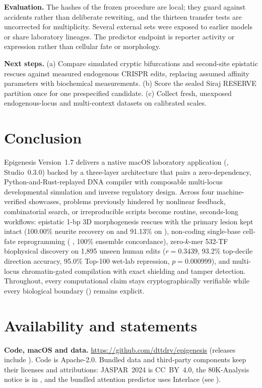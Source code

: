 \documentclass[10.5pt,a4paper]{article}
\begin{document}
\textbf{Evaluation.} The hashes of the frozen procedure are local; they guard against accidents rather than deliberate rewriting, and the thirteen transfer tests are uncorrected for multiplicity. Several external sets were exposed to earlier models or share laboratory lineages. The predictor endpoint is reporter activity or expression rather than cellular fate or morphology.

\textbf{Next steps.} (a) Compare simulated cryptic bifurcations and second-site epistatic rescues against measured endogenous CRISPR edits, replacing assumed affinity parameters with biochemical measurements. (b) Score the sealed Siraj RESERVE partition once for one prespecified candidate. (c) Collect fresh, unexposed endogenous-locus and multi-context datasets on calibrated scales.

\section{Conclusion}

Epigenesis Version~1.7 delivers a native macOS laboratory application (, Studio~0.3.0) backed by a three-layer architecture that pairs a zero-dependency, Python-and-Rust-replayed DNA compiler with composable multi-locus developmental simulation and inverse regulatory design. Across four machine-verified showcases, problems previously hindered by nonlinear feedback, combinatorial search, or irreproducible scripts become routine, seconds-long workflows: epistatic 1-bp 3D morphogenesis rescues with the primary lesion kept intact (100.00\% neurite recovery on  and 91.13\% on ), non-coding single-base cell-fate reprogramming ( , 100\% ensemble concordance), zero-$k$-mer 532-TF biophysical discovery on 1,895 unseen human edits ($r=0.3439$, 93.2\% top-decile direction accuracy, 95.0\% Top-100 wet-lab repression, $p=0.000999$), and multi-locus chromatin-gated compilation with exact shielding and tamper detection. Throughout, every computational claim stays cryptographically verifiable while every biological boundary () remains explicit.

\section{Availability and statements}

\textbf{Code, macOS  and data.} \url{https://github.com/dttdrv/epigenesis} (releases include ). Code is Apache-2.0. Bundled data and third-party components keep their licenses and attributions: JASPAR~2024 is CC~BY~4.0, the 80K-Analysis notice is in , and the bundled attention predictor uses Interlace (see ).
\end{document}

